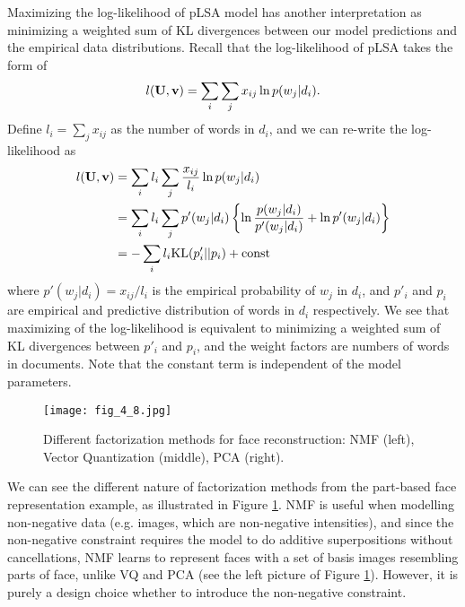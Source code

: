 \documentclass[../main.tex]{subfiles}
\begin{document}
\begin{remark}
	Maximizing the log-likelihood of pLSA model has another interpretation as minimizing a weighted sum of KL divergences between our model predictions and the empirical data distributions. Recall that the log-likelihood of pLSA takes the form of
	\begin{equation*}
	l({\bf U,v})=\sum_{i}\sum_{j}x_{ij} \ln p(w_j|d_i).
	\end{equation*}
	Define $l_i=\sum_j x_{ij}$ as the number of words in $d_i$, and we can re-write the log-likelihood as
	\begin{align*}
	l({\bf U,v})&=\sum_{i}l_i\sum_{j}\frac{x_{ij}}{l_i}\ln p(w_j|d_i)\\
	&= \sum_{i}l_i\sum_{j} p'(w_j|d_i)\left\{\ln \frac{p(w_j|d_i)}{p'(w_j|d_i)} +\ln p'(w_j|d_i)\right\}\\
	&= -\sum_{i}l_i {\rm KL}(p'_{i}||p_i) + {\rm const}
	\end{align*}
	where $p'(w_j|d_i) = x_{ij}/l_i$ is the empirical probability of $w_j$ in $d_i$, and $p'_i$ and $p_i$ are empirical and predictive distribution of words in $d_i$ respectively. We see that maximizing of the log-likelihood is equivalent to minimizing a weighted sum of KL divergences between $p'_i$ and $p_i$, and the weight factors are numbers of words in documents. Note that the constant term is independent of the model parameters.
\end{remark}
\begin{figure}[h] 
	\centering 
	\texttt{[image: fig\_4\_8.jpg]} 
	\caption{Different factorization methods for face reconstruction: NMF (left), Vector Quantization (middle), PCA (right).}\label{fig_4_8}
\end{figure}
\par We can see the different nature of factorization methods from the part-based face representation example, as illustrated in Figure \ref{fig_4_8}. NMF is useful when modelling non-negative data (e.g. images, which are non-negative intensities), and since the non-negative constraint requires the model to do additive superpositions without cancellations, NMF learns to represent faces with a set of basis images resembling parts of face, unlike VQ and PCA (see the left picture of Figure \ref{fig_4_8}). However, it is purely a design choice whether to introduce the non-negative constraint.
\end{document}
